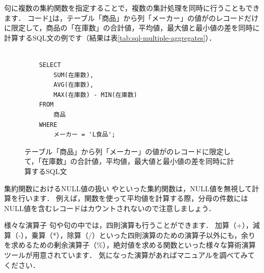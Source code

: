 句に複数の集約関数を指定することで，複数の集計処理を同時に行うこともできます．
コード\ref{code:sql-multiple-aggregates}は，テーブル「商品」から列「メーカー」の値がのレコードだけに限定して，商品の「在庫数」の合計値，平均値，最大値と最小値の差を同時に計算するSQL文の例です（結果は表\ref{tab:sql-multiple-aggregates}）．
\begin{figure}[!htbp]
    \begin{verbatim}

    SELECT
        SUM(在庫数),
        AVG(在庫数),
        MAX(在庫数) - MIN(在庫数)
    FROM
        商品
    WHERE
        メーカー = 'L食品';

    \end{verbatim}
    \captionsetup{name=コード}
    \caption{テーブル「商品」から列「メーカー」の値がのレコードに限定して，「在庫数」の合計値，平均値，最大値と最小値の差を同時に計算するSQL文}
    \label{code:sql-multiple-aggregates}
\end{figure}
\begin{table}[!htbp]
    \centering
    \caption{テーブル「商品」から列「メーカー」の値がのレコードに限定して「在庫数」の合計値，平均値，最大値と最小値の差を同時に計算した結果}
    \label{tab:sql-multiple-aggregates}
\end{table}

\begin{notebox}{集約関数におけるNULL値の扱い}
やといった集約関数は，NULL値を無視して計算を行います．
例えば，関数を使って平均値を計算する際，分母の件数にはNULL値を含むレコードはカウントされないので注意しましょう．
\end{notebox}

\begin{notebox}{様々な演算子}
句や句の中では，四則演算も行うことができます．
加算（+），減算（-），乗算（*），除算（/）といった四則演算のための演算子以外にも，余りを求めるための剰余演算子（\%），絶対値を求める関数といった様々な算術演算ツールが用意されています．
気になった演算があればマニュアルを調べてみてください．
\end{notebox}

